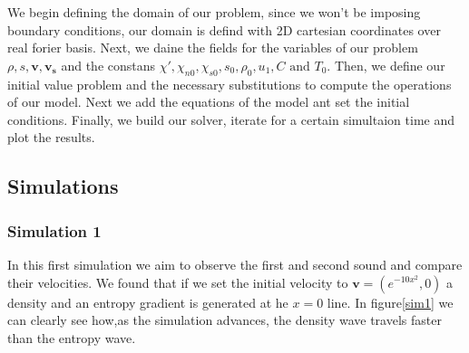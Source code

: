 \documentclass{article}
\begin{document}
We begin defining the domain of our problem, since we won't be imposing boundary conditions, our domain is defind with 2D cartesian coordinates over real forier basis.
Next, we daine the fields for the variables of our problem \(\rho, s, \mathbf{v}, \mathbf{v_s}\) and the constans \(\chi', \chi_{n0}, \chi_{s0}, s_0, \rho_0, u_1, C \text{ and } T_0\).
Then, we define our initial value problem and the necessary substitutions to compute the operations of our model.
Next we add the equations of the model ant set the initial conditions. 
Finally, we build our solver, iterate for a certain simultaion time and plot the results.

\subsection{Simulations}

\subsubsection{Simulation 1}
In this first simulation we aim to observe the first and second sound and compare their velocities.
We found that if we set the initial velocity to \(\mathbf{v} = (e^{-10x^2}, 0)\) a density and an entropy gradient is generated at he \(x=0\) line. 
In figure\ref{sim1} we can clearly see how,as the simulation advances, the density wave travels faster than the entropy wave.
\end{document}
